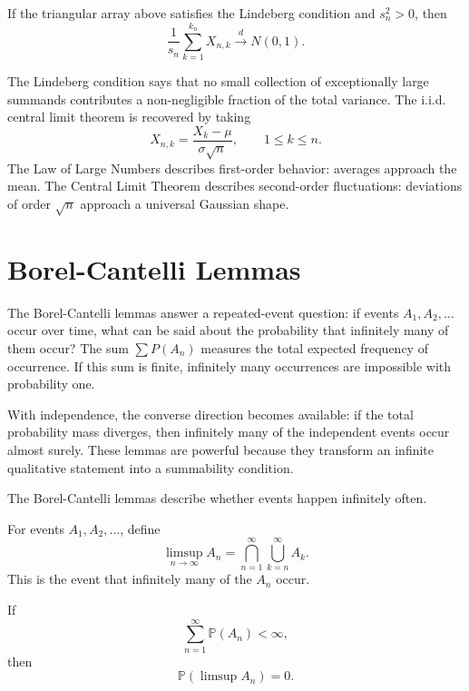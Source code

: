 \begin{theorem}
If the triangular array above satisfies the Lindeberg condition and $s_n^2>0$, then
\[
    \frac1{s_n}\sum_{k=1}^{k_n}X_{n,k}
    \xrightarrow{d}N(0,1).
\]
\end{theorem}

\begin{remark}
The Lindeberg condition says that no small collection of exceptionally large summands contributes a non-negligible fraction of the total variance. The i.i.d. central limit theorem is recovered by taking
\[
    X_{n,k}=\frac{X_k-\mu}{\sigma\sqrt n},
    \qquad 1\leq k\leq n.
\]
The Law of Large Numbers describes first-order behavior: averages approach the mean. The Central Limit Theorem describes second-order fluctuations: deviations of order $\sqrt n$ approach a universal Gaussian shape.
\end{remark}

\section{Borel-Cantelli Lemmas}


The Borel-Cantelli lemmas answer a repeated-event question: if events $A_1,A_2,\dots$ occur over time, what can be said about the probability that infinitely many of them occur? The sum $\sum P(A_n)$ measures the total expected frequency of occurrence. If this sum is finite, infinitely many occurrences are impossible with probability one.

With independence, the converse direction becomes available: if the total probability mass diverges, then infinitely many of the independent events occur almost surely. These lemmas are powerful because they transform an infinite qualitative statement into a summability condition.

The Borel-Cantelli lemmas describe whether events happen infinitely often.

\begin{definition}
For events $A_1,A_2,\dots$, define
\[
    \limsup_{n\to\infty}A_n=\bigcap_{n=1}^{\infty}\bigcup_{k=n}^{\infty}A_k.
\]
This is the event that infinitely many of the $A_n$ occur.
\end{definition}

\begin{theorem}
If
\[
    \sum_{n=1}^{\infty}\mathbb{P}(A_n)<\infty,
\]
then
\[
    \mathbb{P}(\limsup A_n)=0.
\]
\end{theorem}


